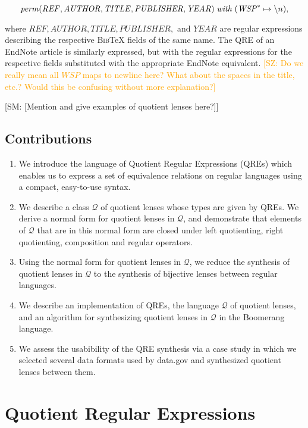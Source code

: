 \documentclass{svproc}
\newcommand{\FINISH}[3]{\ifdraft\textcolor{#1}{[#2: #3]}\fi}
\newcommand{\saz}[1]{\FINISH{orange}{SZ}{#1}}
\newcommand{\sam}[1]{\FINISH{dkpurple}{SM}{#1}}
\newcommand{\re}[1]{\ensuremath{\mathit{#1}}}
\newcommand{\perm}[2]{\ensuremath{\mathit{perm}(#1)\; \mathit{with}\; #2}}
\begin{document}
$$\perm{\re{REF}, \re{AUTHOR}, \re{TITLE}, \re{PUBLISHER}, \re{YEAR}}{(\re{WSP}^* \mapsto \string \n)},$$ 

\noindent where $\re{REF}, \re{AUTHOR}, \re{TITLE}, \re{PUBLISHER},$ and $\re{YEAR}$ are
regular expressions describing the respective \textsc{Bib}\TeX\; fields of the
same name. The QRE of an EndNote article is similarly expressed, but with the
regular expressions for the respective fields substituted with the appropriate
EndNote equivalent.  \saz{Do we really mean all \re{WSP} maps to newline here?
  What about the spaces in the title, etc.?  Would this be confusing without
  more explanation?}

\sam{[Mention and give examples of quotient lenses here?]}

\subsection{Contributions}
\begin{enumerate}
  \item
  We introduce the language of Quotient Regular Expressions (QREs) which enables
  us to express a set of equivalence relations on regular languages using a
  compact, easy-to-use syntax.
  \item
  We describe a class $\mathcal{Q}$ of quotient lenses whose types are given by
  QREs. We derive a normal form for quotient lenses in $\mathcal{Q}$, and
  demonstrate that elements of $\mathcal{Q}$ that are in this normal form are
  closed under left quotienting, right quotienting, composition and regular
  operators.
  \item
  Using the normal form for quotient lenses in $\mathcal{Q}$, we reduce the
  synthesis of quotient lenses in $\mathcal{Q}$ to the synthesis of bijective
  lenses between regular languages. 
  \item
  We describe an implementation of QREs, the language $\mathcal{Q}$ of quotient
  lenses, and an algorithm for synthesizing quotient lenses in $\mathcal{Q}$ in
  the Boomerang language.
  \item
  We assess the usabibility of the QRE synthesis via a case study in which we
  selected several data formats used by data.gov and synthesized quotient lenses
  between them.
\end{enumerate}

\section{Quotient Regular Expressions}
\end{document}
